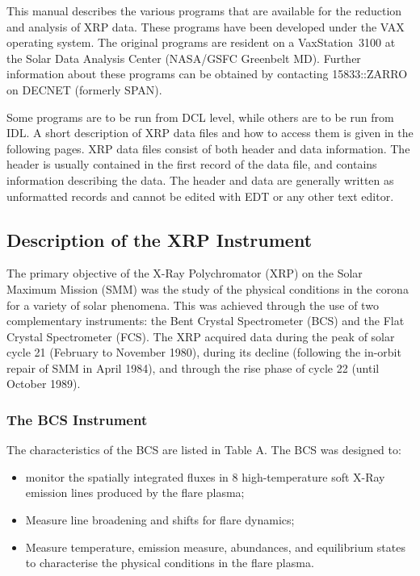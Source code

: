 This manual describes the various programs that are  available for the
reduction and analysis of XRP data. These programs have been developed under
the VAX operating system. The original programs are resident on a
VaxStation~3100 at the Solar Data Analysis Center (NASA/GSFC Greenbelt MD).
Further information about these programs can be obtained by contacting
15833::ZARRO on DECNET (formerly SPAN).

Some programs are to be run from DCL level, while others are to be run from
IDL.  A short description of XRP data files and how to  access them is given in
the following pages. XRP data files consist of both header and data
information. The header is usually contained in the first record of the data
file, and contains information describing the data.  The header and data are
generally written as unformatted records and cannot be edited with EDT or any
other text editor.

\subsection{Description of the XRP Instrument}

The primary objective of the X-Ray Polychromator (XRP) on the Solar Maximum
Mission (SMM) was the study of the physical conditions in the corona for a
variety of solar phenomena. This was achieved through the use of two
complementary instruments: the Bent Crystal Spectrometer (BCS) and the Flat
Crystal Spectrometer (FCS). The XRP acquired data during the peak of solar cycle
21 (February to November 1980), during its decline (following the in-orbit
repair of SMM in April 1984), and through the rise phase of cycle 22 (until
October 1989).

\subsubsection{The BCS Instrument}

The characteristics of the BCS are listed in Table A. The BCS was designed to:
\begin{itemize}
\item	 monitor the spatially integrated fluxes in 8 high-temperature soft
	  X-Ray emission lines produced by the flare plasma;

\item	 Measure line broadening and shifts for flare dynamics;

\item	 Measure temperature, emission measure, abundances, and equilibrium
	  states to characterise the physical conditions in the flare plasma.

\end{itemize}

